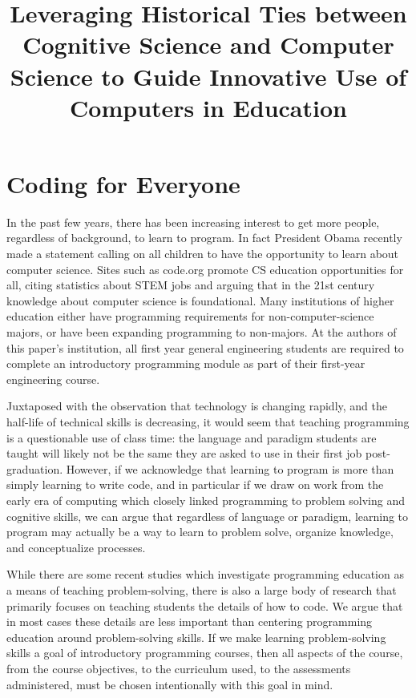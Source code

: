 \documentclass[12pt]{article}
\title{\large \textbf{Leveraging Historical Ties between Cognitive Science and
  Computer Science to Guide Innovative Use of Computers in Education}}
\author{}
\date{}
\begin{document}
\raggedright
\maketitle
\thispagestyle{empty}
\pagestyle{empty}

\section{Coding for Everyone}
In the past few years, there has been increasing interest to get more
people, regardless of background, to learn to program. In fact
President Obama recently made a statement calling on all children to
have the opportunity to learn about computer
science\autocite{whitehouse_computer_2016}. Sites such as code.org
promote CS education opportunities for all, citing statistics about
STEM jobs and arguing that in the 21st century knowledge about
computer science is foundational\autocite{code.org_every_2016}. Many
institutions of higher education either have programming requirements
for non-computer-science majors, or have been expanding programming to
non-majors\autocite{rich_cs1_2004,forte_motivation_2005,guzdial_design_2005}. At
the authors of this paper's institution, all first year general
engineering students are required to complete an introductory
programming module as part of their first-year engineering course.

Juxtaposed with the observation that technology is changing rapidly,
and the half-life of technical skills is
decreasing\autocite{nae_educating_2004}, it would seem that teaching
programming is a questionable use of class time: the language and
paradigm students are taught will likely not be the same they are
asked to use in their first job post-graduation. However, if we
acknowledge that learning to program is more than simply learning to
write code, and in particular if we draw on work from the early era of
computing which closely linked programming to problem solving and
cognitive skills, we can argue that regardless of language or
paradigm, learning to program may actually be a way to learn to
problem solve, organize knowledge, and conceptualize processes.

While there are some recent studies which investigate programming
education as a means of teaching problem-solving, there is also a
large body of research that primarily focuses on teaching students the
details of how to code. We argue that in most cases these details are
less important than centering programming education around
problem-solving skills. If we make learning problem-solving skills a
goal of introductory programming courses, then all aspects of the
course, from the course objectives, to the curriculum used, to the
assessments administered, must be chosen intentionally with this goal
in mind. 
\end{document}

